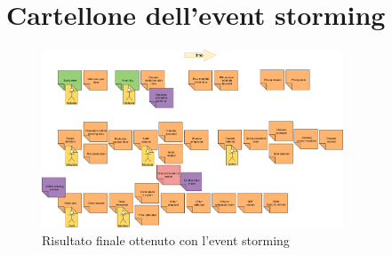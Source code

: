 \chapter{Cartellone dell'event storming}
\label{app:cartellone-event-storming}

\begin{figure}[!ht]
  \centering
  \includegraphics[width=0.8\textwidth]{images/event-storming.png}
  \caption{Risultato finale ottenuto con l'event storming}
  \label{fig:event-storming-result}
\end{figure}